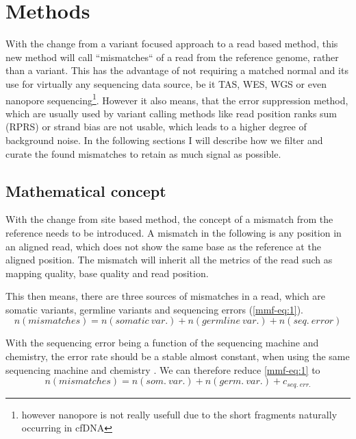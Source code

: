 \section{Methods}
\label{mmf-sec:methods}

With the change from a variant focused approach to a read based method, this new method will call ``mismatches`` of a read from the reference genome, rather than a variant. This has the advantage of not requiring a matched normal and its use for virtually any sequencing data source, be it TAS, WES, WGS or even nanopore sequencing\footnote{however nanopore is not really usefull due to the short fragments naturally occurring in cfDNA}. However it also means, that the error suppression method, which are usually used by variant calling methods like read position ranks sum (RPRS) or strand bias are not usable, which leads to a higher degree of background noise. In the following sections I will describe how we filter and curate the found mismatches to retain as much signal as possible.

\subsection{Mathematical concept}
\label{mmf-sec:concept}
With the change from site based method, the concept of a mismatch from the reference needs to be introduced. A mismatch in the following is any position in an aligned read, which does not show the same base as the reference at the aligned position. The mismatch will inherit all the metrics of the read such as mapping quality, base quality and read position. 

This then means, there are three sources of mismatches in a read, which are somatic variants, germline variants and sequencing errors (\autoref{mmf-eq:1}).
\begin{equation}
n(mismatches) = n(somatic~var.) + n(germline~var.)  + n(seq.~ error)
\label{mmf-eq:1}
\end{equation}
\myequation[\ref{mmf-eq:1}]{MisMatchFinder: number of mismatches}

With the sequencing error being a function of the sequencing machine and chemistry, the error rate should be a stable almost constant, when using the same sequencing machine and chemistry \cite{Schirmer2016,Stoler2021}. We can therefore reduce \autoref{mmf-eq:1} to
\begin{equation}
n(mismatches) = n(som.~var.) + n(germ.~var.)  + c_{seq.~err.}
\label{mmf-eq:2}
\end{equation}
\myequation[\ref{mmf-eq:2}]{MisMatchFinder: sequencing error}

